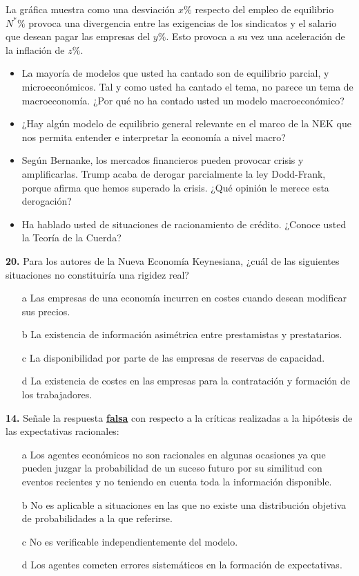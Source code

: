 \documentclass{nuevotema}
\begin{document}
La gráfica muestra como una desviación $x \%$ respecto del empleo de equilibrio $N^* \%$ provoca una divergencia entre las exigencias de los sindicatos y el salario que desean pagar las empresas del $y \%$. Esto provoca a su vez una aceleración de la inflación de $z \%$.

\preguntas


\begin{itemize}
    \item La mayoría de modelos que usted ha cantado son de equilibrio parcial, y microeconómicos. Tal y como usted ha cantado el tema, no parece un tema de macroeconomía. ¿Por qué no ha contado usted un modelo macroeconómico?
    \item ¿Hay algún modelo de equilibrio general relevante en el marco de la NEK que nos permita entender e interpretar la economía a nivel macro?
    \item Según Bernanke, los mercados financieros pueden provocar crisis y amplificarlas. Trump acaba de derogar parcialmente la ley Dodd-Frank, porque afirma que hemos superado la crisis. ¿Qué opinión le merece esta derogación?
    \item Ha hablado usted de situaciones de racionamiento de crédito. ¿Conoce usted la Teoría de la Cuerda?
\end{itemize}


\textbf{20.} Para los autores de la Nueva Economía Keynesiana, ¿cuál de las siguientes situaciones no constituiría una rigidez real?

\begin{itemize}
	\item[a] Las empresas de una economía incurren en costes cuando desean modificar sus precios.
	\item[b] La existencia de información asimétrica entre prestamistas y prestatarios.
	\item[c] La disponibilidad por parte de las empresas de reservas de capacidad.
	\item[d] La existencia de costes en las empresas para la contratación y formación de los trabajadores.
\end{itemize}

\textbf{14.} Señale la respuesta \textbf{\underline{falsa}} con respecto a la críticas realizadas a la hipótesis de las expectativas racionales:
\begin{itemize}
	\item[a] Los agentes económicos no son racionales en algunas ocasiones ya que pueden juzgar la probabilidad de un suceso futuro por su similitud con eventos recientes y no teniendo en cuenta toda la información disponible.
	\item[b] No es aplicable a situaciones en las que no existe una distribución objetiva de probabilidades a la que referirse.
	\item[c] No es verificable independientemente del modelo.
	\item[d] Los agentes cometen errores sistemáticos en la formación de expectativas.
\end{itemize}
\end{document}
